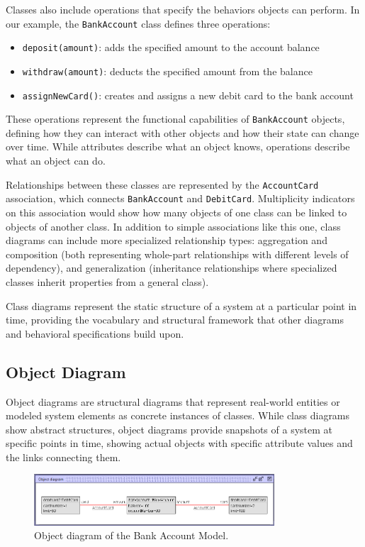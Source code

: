Classes also include operations that specify the behaviors objects can perform. 
In our example, the \texttt{BankAccount} class defines three operations:
\begin{itemize}
    \item \texttt{deposit(amount)}: adds the specified amount to the account balance
    \item \texttt{withdraw(amount)}: deducts the specified amount from the balance
    \item \texttt{assignNewCard()}: creates and assigns a new debit card to the bank account
\end{itemize}

These operations represent the functional capabilities of \texttt{BankAccount} objects, 
defining how they can interact with other objects and how their state can change over 
time. While attributes describe what an object knows, operations describe what an 
object can do.

Relationships between these classes are represented by the \texttt{AccountCard} 
association, which connects \texttt{BankAccount} and \texttt{DebitCard}. 
Multiplicity indicators on this association would show how many objects of one class 
can be linked to objects of another class. In addition to simple associations like 
this one, class diagrams can include more specialized relationship types: aggregation 
and composition (both representing whole-part relationships with different levels of 
dependency), and generalization (inheritance relationships where specialized classes 
inherit properties from a general class).

Class diagrams represent the static structure of a system at a particular point in 
time, providing the vocabulary and structural framework that other diagrams and 
behavioral specifications build upon.


\subsection{Object Diagram}
\hspace{1cm} Object diagrams are structural diagrams that represent real-world entities or 
modeled system elements as concrete instances of classes. While class diagrams 
show abstract structures, object diagrams provide snapshots of a system at specific 
points in time, showing actual objects with specific attribute values and the links 
connecting them.

\begin{figure}[H]
    \begin{center}
        \includegraphics[width=0.8\textwidth]{figures/c1/BankAccount/BA_ObjectDiagram.png}
        \caption{Object diagram of the Bank Account Model.}
        \label{fig:object_diagram_bank_account_model}
    \end{center}
\end{figure}


